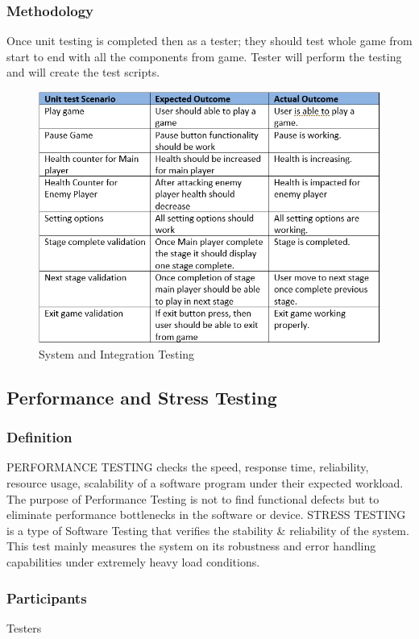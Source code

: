 \documentclass{article}
\begin{document}
\subsubsection{Methodology}
Once unit testing is completed then as a tester; they should test whole game from start to end with all the components from game. Tester will perform the testing and will create the test scripts.
\begin{figure}[h]
    \centering
    \includegraphics[scale=0.9]{./images/unittesting.PNG}
    \caption{System and Integration Testing}
    \label{fig:my_label}
\end{figure}
\subsection{Performance and Stress Testing}
\subsubsection{Definition}
PERFORMANCE TESTING checks the speed, response time, reliability, resource usage, scalability of a software program under their expected workload. The purpose of Performance Testing is not to find functional defects but to eliminate performance bottlenecks in the software or device.
STRESS TESTING is a type of Software Testing that verifies the stability & reliability of the system. This test mainly measures the system on its robustness and error handling capabilities under extremely heavy load conditions.\cite{ST}

\subsubsection{Participants}
Testers 
\end{document}
